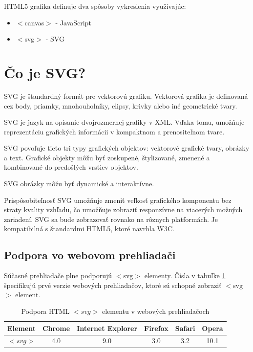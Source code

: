 HTML5 grafika definuje  dva spôsoby vykreslenia využívajúc: 
\begin{itemize}
	\item $<$canvas$>$ - JavaScript
	\item $<$svg$>$ - SVG
\end{itemize}


\section{Čo je SVG?}
\ac{SVG} je štandardný formát pre vektorovú grafiku. Vektorová grafika je definovaná cez body, priamky, mnohouholníky, elipsy, krivky alebo iné geometrické tvary.  

\acs{SVG} je jazyk na opísanie dvojrozmernej grafiky v   \ac*{XML}. Vďaka tomu, umožňuje reprezentáciu grafických informácii v kompaktnom a prenositeľnom tvare.

 SVG povoľuje tieto tri typy grafických objektov: vektorové grafické tvary, obrázky a text. 
Grafické objekty môžu byť zoskupené, štylizované, zmenené a kombinované do predošlých vrstiev objektov. 

SVG obrázky môžu byť dynamické a interaktívne.

Prispôsobiteľnosť SVG umožňuje zmeniť veľkosť grafického komponentu bez straty kvality vzhľadu, čo umožňuje zobraziť responzívne na viacerých možných zariadení. SVG sa bude zobrazovať rovnako na rôznych platformách. Je kompatibilná s štandardmi \acs{HTML}5, ktoré navrhla \ac*{W3C}. 


 \subsection{Podpora vo webovom prehliadači}
 Súčasné prehliadače plne podporujú $<$svg$>$ elementy.  
  Čísla v tabuľke \ref{svgpreh} špecifikujú prvé verzie webových prehliadačov, ktoré sú schopné zobraziť $<$svg$>$ element.\cite{w3svg}
  
\begin{table}[H]
\begin{center}
		\begin{tabular}{|c|c|c|c|c|c|}
		\hline \textbf{Element} & \textbf{Chrome} & \textbf{Internet} \textbf{Explorer}  & \textbf{Firefox}  & \textbf{Safari} & \textbf{Opera}  \\ 
		\hline $<svg>$ & 4.0& 9.0 & 3.0 & 3.2  &   10.1 \\ 
		\hline 
	\end{tabular} 
\end{center}
	
	\caption{Podpora HTML $<svg>$ elementu v webových prehliadačoch}
	\label{svgpreh}
\end{table}
 
